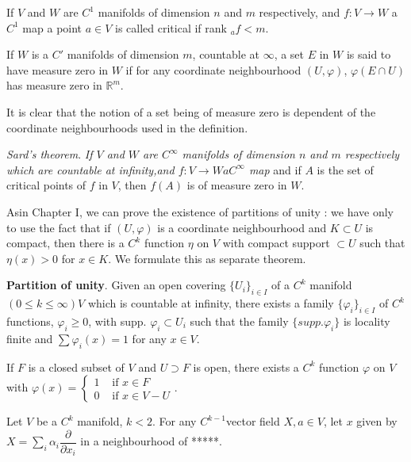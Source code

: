 \begin{defi*}
  If $V$ and $W$ are $C^1$ manifolds of dimension $n$ and $m$
  respectively, and $f: V \to W$ a $C^1$ map a point $a \in V$ is
  called critical if rank $ _a f<m$. 
\end{defi*}

\begin{defi*}
  If  $W$ is a  $C'$ manifolds of dimension $m$, countable at
  $\infty$, a set $E$ in $W$ is said to have measure zero in $W$ if
  for any coordinate neighbourhood $(U, \varphi)$, $\varphi (E \cap
  U)$ has measure zero in $\mathbb{R}^m$. 
\end{defi*}
    
It is clear that the notion of a set being of measure zero is
dependent of the coordinate neighbourhoods used in the
definition. 

\noindent
\textit{Sard's theorem}. \textit{If $V$ and $W$ are
  $C^\infty$ manifolds of dimension $n$ and $m$ respectively which are
  countable at infinity,and $f: V \to W a C^\infty$ map} and if $A$
is the set of critical points of $f$ in $V$, then $f(A)$ is of measure
zero in $W$. 
    
As\pageoriginale in Chapter I, we can prove the existence of partitions of  unity
: we have only to use the fact that if $(U, \varphi)$ is a coordinate
neighbourhood and $K \subset U$ is compact, then there is a $C^k$
function $\eta$ on $V$ with compact support $\subset U$ such that
$\eta (x) > 0$ for $x \in K$. We formulate this as separate theorem. 
    
\medskip
\noindent
\textbf{Partition of unity}. Given an open covering
$\{U_i\}_{i \in I}$ of a $C^k$ manifold $(0 \le k \le \infty) V$ which
is countable at  infinity, there exists a family $\{\varphi_i \}_{i
  \in I}$ of $C^k$ functions, $\varphi_i \ge 0$, with supp.
$\varphi_i \subset U_i$ such that the family  $\{ supp. \varphi_i\}$
is locality finite and $\sum \varphi_i (x) =1$ for any $x \in V$. 

\begin{coro*}
  If $F$ is a closed subset of $V$ and $U \supset F$ is open, there
  exists a $C^k$ function $\varphi$ on $V$ with $\varphi(x)
  = \begin{cases} 1 &\text{ if } x \in F \\ 0 &\text{ if } x \in V
    -U  \end{cases}$. 
\end{coro*}    
    
Let $V$ be a $C^k$ manifold, $k<2$. For any $C^{k-1}$vector field $X,a
 \in V$, let $x$ given by $X = \sum\limits_i \alpha_i
\dfrac{\partial}{\partial x_i}$ in a neighbourhood of  *****. 

